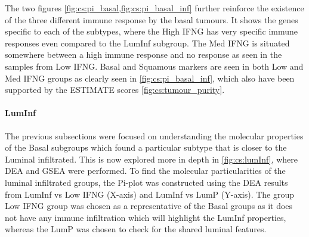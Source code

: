 The two figures \cref{fig:cs:pi_basal,fig:cs:pi_basal_inf} further reinforce the existence of the three different immune response by the basal tumours. It shows the genes specific to each of the subtypes, where the High IFNG has very specific immune responses even compared to the LumInf subgroup. The Med IFNG is situated somewhere between a high immune response and no response as seen in the samples from Low IFNG. Basal and Squamous markers are seen in both Low and Med IFNG groups as clearly seen in \cref{fig:cs:pi_basal_inf}, which also have been supported by the ESTIMATE scores \cref{fig:cs:tumour_purity}.

\paragraph*{LumInf}

The previous subsections were focused on understanding the molecular properties of the Basal subgroups which found a particular subtype that is closer to the Luminal infiltrated. This is now explored more in depth in \cref{fig:cs:lumInf}, where DEA and GSEA were performed. To find the molecular particularities of the luminal infiltrated groups, the Pi-plot was constructed using the DEA results from LumInf vs Low IFNG (X-axis) and LumInf vs LumP (Y-axis). The group Low IFNG group was chosen as a representative of the Basal groups as it does not have any immune infiltration which will highlight the LumInf properties, whereas the LumP was chosen to check for the shared luminal features. 

